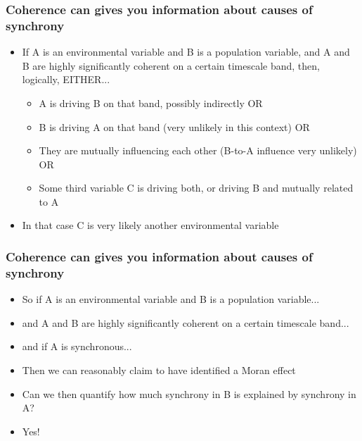 \documentclass{beamer}
\begin{document}
\begin{frame}
\frametitle{Coherence can gives you information about causes of synchrony}
\begin{itemize}
\item If A is an environmental variable and B is a population variable, and A and B are highly significantly
coherent on a certain timescale band, then, logically, EITHER...
\begin{itemize}
\item A is driving B on that band, possibly indirectly OR
\item B is driving A on that band (very unlikely in this context) OR
\item They are mutually influencing each other (B-to-A influence very unlikely) OR
\item Some third variable C is driving both, or driving B and mutually related to A
\end{itemize}
\item In that case C is very likely another environmental variable
\end{itemize}
\end{frame}

\begin{frame}
\frametitle{Coherence can gives you information about causes of synchrony}
\begin{itemize}
\item So if A is an environmental variable and B is a population variable...
\item and A and B are highly significantly coherent on a certain timescale band...
\item and if A is synchronous...
\item Then we can reasonably claim to have identified a Moran effect
\item Can we then quantify how much synchrony in B is explained by synchrony in A?
\item Yes!
\end{itemize}
\end{frame}
\end{document}
